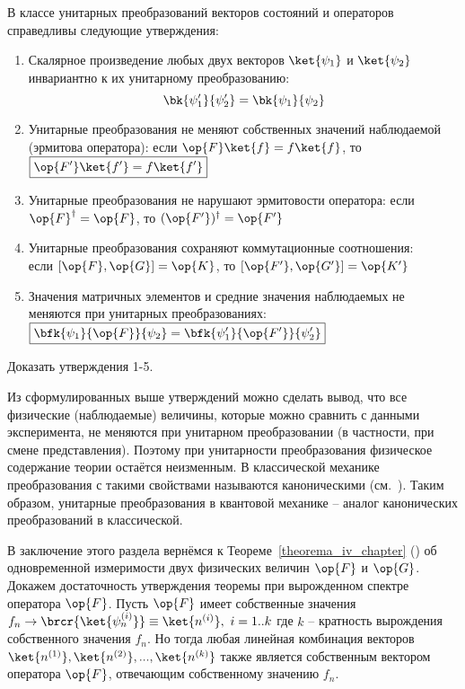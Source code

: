 В классе унитарных преобразований векторов состояний и операторов справедливы следующие утверждения:

\begin{enumerate}

\item Скалярное произведение любых двух векторов $\ket{\psi_1}$ и $\ket{\psi_2}$ инвариантно к их унитарному преобразованию:
$$
\bk{\psi'_1}{\psi'_2}=\bk{\psi_1}{\psi_2}
$$

\item Унитарные преобразования не меняют собственных значений наблюдаемой (эрмитова оператора): если $\op{F}\ket{f}=f\ket{f}$, то $\boxed{\op{F'}\ket{f'}=f\ket{f'}}$

\item Унитарные преобразования не нарушают эрмитовости оператора: если $\op{F}^\dag=\op{F}$, то $(\op{F'})^\dag=\op{F'}$

\item Унитарные преобразования сохраняют коммутационные соотношения: \\
если $[\op{F}, \op{G}]=\op{K}$, то $[\op{F'}, \op{G'}]=\op{K'}$

\item Значения матричных элементов и средние значения наблюдаемых не меняются при унитарных преобразованиях: $\boxed{\bfk{\psi_1}{\op{F}}{\psi_2}=\bfk{\psi'_1}{\op{F'}}{\psi'_2}}$
\end{enumerate}

\begin{excr}
Доказать утверждения 1-5.
\end{excr}

Из сформулированных выше утверждений можно сделать вывод, что все физические (наблюдаемые) величины, которые можно сравнить с данными эксперимента, не меняются при унитарном преобразовании (в частности, при смене представления). Поэтому при унитарности преобразования физическое содержание теории остаётся неизменным. В классической механике преобразования с такими свойствами называются каноническими (см.~). Таким образом, унитарные преобразования в квантовой механике -- аналог канонических преобразований в классической.

В заключение этого раздела вернёмся к Теореме~\ref{theorema_iv_chapter} () об одновременной измеримости двух физических величин $\op{F}$ и $\op{G}$. Докажем достаточность утверждения теоремы при вырожденном спектре оператора $\op{F}$. Пусть $\op{F}$ имеет собственные значения $f_n \rightarrow \brcr{\ket{\psi_n^{(i)}}} \equiv \ket{n^{(i)}},~i = 1..k$ где $k$ -- кратность вырождения собственного значения $f_n$. Но тогда любая линейная комбинация векторов $\ket{n^{(1)}}, \ket{n^{(2)}}, ..., \ket{n^{(k)}}$ также является собственным вектором оператора $\op{F}$, отвечающим собственному значению $f_n$.

